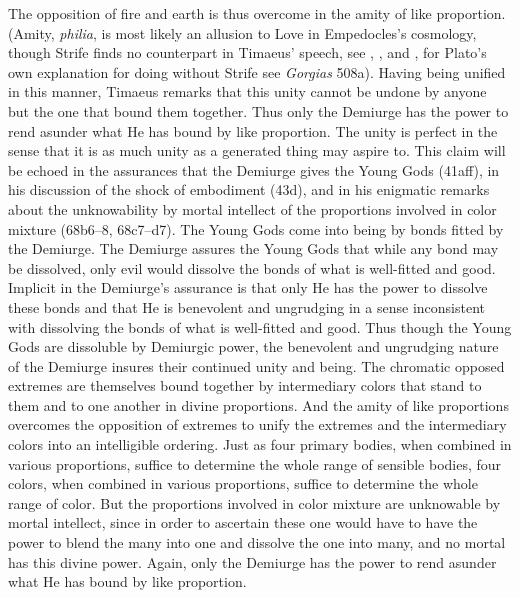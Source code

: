 The opposition of fire and earth is thus overcome in the amity of like proportion. (Amity, \emph{philia}, is most likely an allusion to Love in Empedocles's cosmology, though Strife finds no counterpart in Timaeus' speech, see \citealt[99--100]{Taylor:1928qb}, \citealt[44 n4]{Cornford:1935fk}, and \citealt[230 n119]{Broadie:2012vl}, for Plato's own explanation for doing without Strife see \emph{Gorgias} 508a). Having being unified in this manner, Timaeus remarks that this unity cannot be undone by anyone but the one that bound them together. Thus only the Demiurge has the power to rend asunder what He has bound by like proportion. The unity is perfect in the sense that it is as much unity as a generated thing may aspire to. This claim will be echoed in the assurances that the Demiurge gives the Young Gods (41aff), in his discussion of the shock of embodiment (43d), and in his enigmatic remarks about the unknowability by mortal intellect of the proportions involved in color mixture (68b6–8, 68c7–d7). The Young Gods come into being by bonds fitted by the Demiurge. The Demiurge assures the Young Gods that while any bond may be dissolved, only evil would dissolve the bonds of what is well-fitted and good. Implicit in the Demiurge's assurance is that only He has the power to dissolve these bonds and that He is benevolent and ungrudging in a sense inconsistent with dissolving the bonds of what is well-fitted and good. Thus though the Young Gods are dissoluble by Demiurgic power, the benevolent and ungrudging nature of the Demiurge insures their continued unity and being. The chromatic opposed extremes are themselves bound together by intermediary colors that stand to them and to one another in divine proportions. And the amity of like proportions overcomes the opposition of extremes to unify the extremes and the intermediary colors into an intelligible ordering. Just as four primary bodies, when combined in various proportions, suffice to determine the whole range of sensible bodies, four colors, when combined in various proportions, suffice to determine the whole range of color. But the proportions involved in color mixture are unknowable by mortal intellect, since in order to ascertain these one would have to have the power to blend the many into one and dissolve the one into many, and no mortal has this divine power. Again, only the Demiurge has the power to rend asunder what He has bound by like proportion.

